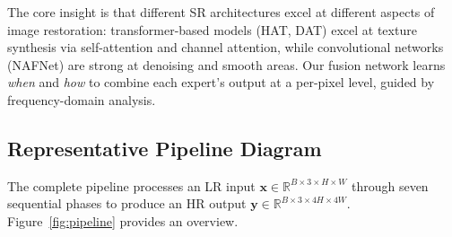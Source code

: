 \documentclass[10pt,twocolumn,letterpaper]{article}
\begin{document}
The core insight is that different SR architectures excel at different aspects of image restoration: transformer-based models (HAT, DAT) excel at texture synthesis via self-attention and channel attention, while convolutional networks (NAFNet) are strong at denoising and smooth areas. Our fusion network learns \textit{when} and \textit{how} to combine each expert's output at a per-pixel level, guided by frequency-domain analysis.

\subsection{Representative Pipeline Diagram}

The complete pipeline processes an LR input $\mathbf{x} \in \mathbb{R}^{B \times 3 \times H \times W}$ through seven sequential phases to produce an HR output $\mathbf{y} \in \mathbb{R}^{B \times 3 \times 4H \times 4W}$. Figure~\ref{fig:pipeline} provides an overview.
\end{document}
